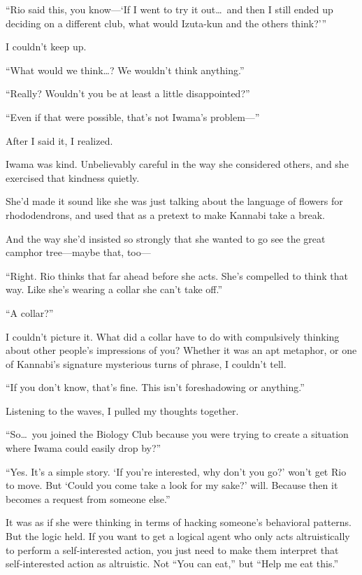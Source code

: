 \documentclass[
    a4paper,
    12pt,
    twoside,
    openany,
    UTF8,
    fontset=windows
]{ctexbook}
\begin{document}
``Rio said this, you know---`If I went to try it out\dots\ and then I still ended up deciding on a different club, what would Izuta-kun and the others think?'''

I couldn't keep up.

``What would we think\dots? We wouldn't think anything.''

``Really? Wouldn't you be at least a little disappointed?''

``Even if that were possible, that's not Iwama's problem---''

After I said it, I realized.

Iwama was kind. Unbelievably careful in the way she considered others, and she exercised that kindness quietly.

She'd made it sound like she was just talking about the language of flowers for rhododendrons, and used that as a pretext to make Kannabi take a break.

And the way she'd insisted so strongly that she wanted to go see the great camphor tree---maybe that, too---

``Right. Rio thinks that far ahead before she acts. She's compelled to think that way. Like she's wearing a collar she can't take off.''

``A collar?''

I couldn't picture it. What did a collar have to do with compulsively thinking about other people's impressions of you? Whether it was an apt metaphor, or one of Kannabi's signature mysterious turns of phrase, I couldn't tell.

``If you don't know, that's fine. This isn't foreshadowing or anything.''

Listening to the waves, I pulled my thoughts together.

``So\dots\ you joined the Biology Club because you were trying to create a situation where Iwama could easily drop by?''

``Yes. It's a simple story. `If you're interested, why don't you go?' won't get Rio to move. But `Could you come take a look for my sake?' will. Because then it becomes a request from someone else.''

It was as if she were thinking in terms of hacking someone's behavioral patterns. But the logic held. If you want to get a logical agent who only acts altruistically to perform a self-interested action, you just need to make them interpret that self-interested action as altruistic. Not ``You can eat,'' but ``Help me eat this.''
\end{document}
